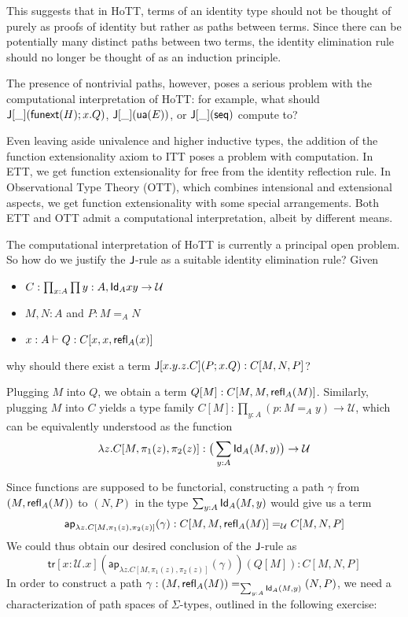 \documentclass[12pt]{article}
\newcommand{\ap}{\mathsf{ap}}
\newcommand{\tr}{\mathsf{tr}}
\newcommand{\seq}{\mathsf{seq}}
\begin{document}
This suggests that in HoTT, terms of an identity type should not be thought of purely as proofs of identity but rather as paths between terms. Since there can be potentially many distinct paths between two terms, the identity elimination rule should no longer be thought of as an induction principle.

The presence of nontrivial paths, however, poses a serious problem with the computational interpretation of HoTT: for example, what should $\mathsf{J}[\_](\mathsf{funext}(H);x.Q)$, $\mathsf{J}[\_](\mathsf{ua}(E))$, or $\J[\_](\seq)$ compute to?

Even leaving aside univalence and higher inductive types, the addition of the function extensionality axiom to ITT poses a problem with computation. In ETT, we get function extensionality for free from the identity reflection rule. In Observational Type Theory (OTT), which combines intensional and extensional aspects, we get function extensionality with some special arrangements. Both ETT and OTT admit a computational interpretation, albeit by different means.

The computational interpretation of HoTT is currently a principal open problem. So how do we justify the $\mathsf{J}$-rule as a suitable identity elimination rule? Given

\begin{itemize}
\item $C : \prod_{x : A} \prod{y : A}, \mathsf{Id}_{A}{x}{y} \to \mathcal{U}$
\item $M,N:A$ and $P:M=_A N$
\item $x:A\vdash Q:C[x,x,\mathsf{refl}_{A}(x)]$
\end{itemize}
why should there exist a term $\mathsf{J}[x.y.z.C](P;x.Q):C[M,N,P]$?

Plugging $M$ into $Q$, we obtain a term $Q[M]:C[M,M,\mathsf{refl}_{A}(M)]$. Similarly, plugging $M$ into $C$ yields a type family $C[M] : \prod_{y:A}(p:M=_A y)\to\mathcal{U}$, which can be equivalently understood as the function \[\lambda z. C[M, \pi_1(z), \pi_2(z)] : \big(\sum_{y:A} \mathsf{Id}_{A}(M,y)\big)\to\mathcal{U} \]

Since functions are supposed to be functorial, constructing a path $\gamma$ from $(M,\mathsf{refl}_{A}(M))$ to $(N,P)$ in the type $\sum_{y:A} \mathsf{Id}_{A}(M,y)$ would give us a term
\[ \ap_{\lambda z. C[M, \pi_1(z), \pi_2(z)]}(\gamma) : C[M,M,\refl{A}(M)] =_\mathcal{U} C[M,N,P] \]
We could thus obtain our desired conclusion of the $\mathsf{J}$-rule as \[ \tr[x : \mathcal{U}.x](\ap_{\lambda z. C[M, \pi_1(z), \pi_2(z)]}(\gamma))(Q[M]) : C[M,N,P]\]
In order to construct a path {\small $\gamma : (M,\mathsf{refl}_{A}(M)) =_{\sum_{y:A} \mathsf{Id}_{A}(M,y)} (N,P)$}, we need a characterization of path spaces of $\Sigma$-types, outlined in the following exercise:
\end{document}
